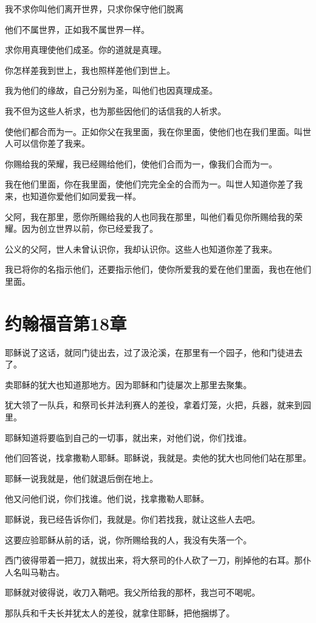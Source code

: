 \documentclass[12pt,oneside]{book}
\begin{document}
我不求你叫他们离开世界，只求你保守他们脱离

他们不属世界，正如我不属世界一样。

求你用真理使他们成圣。你的道就是真理。

你怎样差我到世上，我也照样差他们到世上。

我为他们的缘故，自己分别为圣，叫他们也因真理成圣。

我不但为这些人祈求，也为那些因他们的话信我的人祈求。

使他们都合而为一。正如你父在我里面，我在你里面，使他们也在我们里面。叫世人可以信你差了我来。

你赐给我的荣耀，我已经赐给他们，使他们合而为一，像我们合而为一。

我在他们里面，你在我里面，使他们完完全全的合而为一。叫世人知道你差了我来，也知道你爱他们如同爱我一样。

父阿，我在那里，愿你所赐给我的人也同我在那里，叫他们看见你所赐给我的荣耀。因为创立世界以前，你已经爱我了。

公义的父阿，世人未曾认识你，我却认识你。这些人也知道你差了我来。

我已将你的名指示他们，还要指示他们，使你所爱我的爱在他们里面，我也在他们里面。

\chapter{约翰福音第18章}
耶稣说了这话，就同门徒出去，过了汲沦溪，在那里有一个园子，他和门徒进去了。

卖耶稣的犹大也知道那地方。因为耶稣和门徒屡次上那里去聚集。

犹大领了一队兵，和祭司长并法利赛人的差役，拿着灯笼，火把，兵器，就来到园里。

耶稣知道将要临到自己的一切事，就出来，对他们说，你们找谁。

他们回答说，找拿撒勒人耶稣。耶稣说，我就是。卖他的犹大也同他们站在那里。

耶稣一说我就是，他们就退后倒在地上。

他又问他们说，你们找谁。他们说，找拿撒勒人耶稣。

耶稣说，我已经告诉你们，我就是。你们若找我，就让这些人去吧。

这要应验耶稣从前的话，说，你所赐给我的人，我没有失落一个。

西门彼得带着一把刀，就拔出来，将大祭司的仆人砍了一刀，削掉他的右耳。那仆人名叫马勒古。

耶稣就对彼得说，收刀入鞘吧。我父所给我的那杯，我岂可不喝呢。

那队兵和千夫长并犹太人的差役，就拿住耶稣，把他捆绑了。
\end{document}
